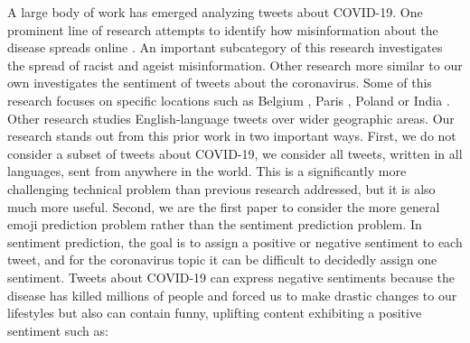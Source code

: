 \documentclass[11pt]{article}
\begin{document}

A large body of work has emerged analyzing tweets about COVID-19.
One prominent line of research attempts to identify how misinformation about the disease spreads online \citep{kouzy2020coronavirus,sharma2020coronavirus,yang2020prevalence,elhadad2020covid,prabhakar2020informational}.
An important subcategory of this research investigates the spread of racist \citep{budhwani2020creating,schild2020go} and ageist \citep{jimenez2020coronavirus} misinformation.
Other research more similar to our own investigates the sentiment of tweets about the coronavirus.
Some of this research focuses on specific locations such as Belgium \citep{kurten2020coronavirus}, Paris \citep{saire2020study}, Poland \citep{jarynowski2020perception} or India \citep{subasish2020}.
Other research studies English-language tweets \citep{rajput2020word,yin2020detecting} over wider geographic areas.
Our research stands out from this prior work in two important ways.
First, we do not consider a subset of tweets about COVID-19,
we consider all tweets, written in all languages, sent from anywhere in the world.
This is a significantly more challenging technical problem than previous research addressed,
but it is also much more useful.
Second, we are the first paper to consider the more general emoji prediction problem rather than the sentiment prediction problem.
In sentiment prediction,
the goal is to assign a positive or negative sentiment to each tweet,
and for the coronavirus topic it can be difficult to decidedly assign one sentiment. Tweets about COVID-19 can express negative sentiments because the disease has killed millions of people and forced us to make drastic changes to our lifestyles but also can contain funny, uplifting content exhibiting a positive sentiment such as:
\end{document}
